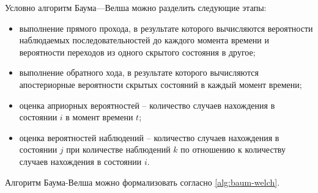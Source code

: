 \noindent Условно алгоритм Баума---Велша можно разделить следующие этапы:
\begin{itemize}
	\item выполнение прямого прохода, в результате которого вычисляются вероятности наблюдаемых последовательностей до каждого момента времени и вероятности переходов из одного скрытого состояния в другое;
	\item выполнение обратного хода, в результате которого вычисляются апостериорные вероятности скрытых состояний в каждый момент времени;
	\item оценка априорных вероятностей -- количество случаев нахождения в состоянии $i$ в момент времени $t$;
	\item оценка вероятностей наблюдений -- количество случаев нахождения в состоянии $j$ при количестве наблюдений $k$ по отношению к количеству случаев нахождения в состоянии $i$.
\end{itemize}

Алгоритм Баума-Велша можно формализовать согласно \ref{alg:baum-welch}.

